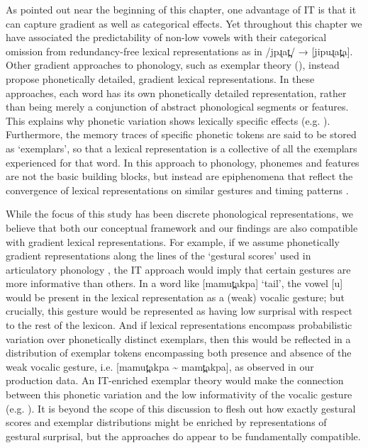\documentclass[output=paper,colorlinks,citecolor=brown]{langscibook}
\begin{document}
As pointed out near the beginning of this chapter, one advantage of IT is that it can capture gradient as well as categorical effects. Yet throughout this chapter we have associated the predictability of non-low vowels with their categorical omission from redundancy-free lexical representations as in /jpɻat̪/ → [jipuɻat̪a]. Other gradient approaches to phonology, such as exemplar theory (\citealt{bybee2000phonology,pierrehumbert2001exemplar}), instead propose phonetically detailed, gradient lexical representations. In these approaches, each word has its own phonetically detailed representation, rather than being merely a conjunction of abstract phonological segments or features. This explains why phonetic variation shows lexically specific effects (e.g. \citealt{jurafsky2002role,walker2012form}). Furthermore, the memory traces of specific phonetic tokens are said to be stored as `exemplars', so that a lexical representation is a collective of all the exemplars experienced for that word. In this approach to phonology, phonemes and features are not the basic building blocks, but instead are epiphenomena that reflect the convergence of lexical representations on similar gestures and timing patterns \citep[72]{bybee2000phonology}.

While the focus of this study has been discrete phonological representations, we believe that both our conceptual framework and our findings are also compatible with gradient lexical representations. For example, if we assume phonetically gradient representations along the lines of the `gestural scores' used in articulatory phonology \citep{browman1992articulatory}, the IT approach would imply that certain gestures are more informative than others. In a word like [mamut̪akpa] `tail', the vowel [u] would be present in the lexical representation as a (weak) vocalic gesture; but crucially, this gesture would be represented as having low surprisal with respect to the rest of the lexicon. And if lexical representations encompass probabilistic variation over phonetically distinct exemplars, then this would be reflected in a distribution of exemplar tokens encompassing both presence and absence of the weak vocalic gesture, i.e. [mamut̪akpa {\textasciitilde} mamt̪akpa], as observed in our production data. An IT-enriched exemplar theory would make the connection between this phonetic variation and the low informativity of the vocalic gesture (e.g. \citealt{vanSonvanSanten2005,Hall2009,CohenPriva2015,CohenPriva2017,ShawKawahara2017,HallEtAl2018}). It is beyond the scope of this discussion to flesh out how exactly gestural scores and exemplar distributions might be enriched by representations of gestural surprisal, but the approaches do appear to be fundamentally compatible.
\end{document}

